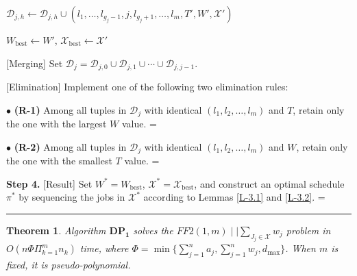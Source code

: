 \documentclass[12pt, eqno, limlimits]{article}
\newtheorem{theorem}{Theorem}[section]
\begin{document}
\begin{sloppypar}
\begin{algorithm}[tbp]
{{{{{                                $\mathcal{D}_{j,h} \leftarrow \mathcal{D}_{j,h} \cup (l_1, \ldots, l_{g_j-1}, j, l_{g_j+1}, \ldots, l_m, T', W', \mathcal{X}')$ \;
                                
                                { $W_{\text{best}} \gets W'$, $\mathcal{X}_{\text{best}} \gets \mathcal{X}'$ \;}
                            }	
                        }
                    }
                    
                    [Merging] Set $\mathcal{D}_{j}=\mathcal{D}_{j,0} \cup \mathcal{D}_{j,1} \cup \cdots \cup \mathcal{D}_{j,j-1}$. \;
                    
                    [Elimination] Implement one of the following two elimination rules:
                    
                    
                    $\bullet$ \textbf{(R-1)} Among all tuples in $\mathcal{D}_j$ with identical $(l_1, l_2, \dots, l_m)$ and $T$, retain only the one with the largest $W$ value. \hspace*{\algorithmicindent}%
                    \hangindent=\dimexpr{}\relax  %
                    
                    $\bullet$ \textbf{(R-2)} Among all tuples in $\mathcal{D}_j$ with identical $(l_1, l_2, \dots, l_m)$ and $W$, retain only the one with the smallest $T$ value. \hspace*{\algorithmicindent}%
                    \hangindent=\dimexpr{}\relax%
                }
            } 
            
            \textbf{Step 4.} [Result] Set $W^{*}=W_{\text{best}}$, $\mathcal{X}^{*}=\mathcal{X}_{\text{best}}$, and construct an optimal schedule $\pi^{*}$ by sequencing the jobs in $\mathcal{X}^{*}$ according to Lemmas \ref{L-3.1} and \ref{L-3.2}. \hspace*{\algorithmicindent}%
            \hangindent=\dimexpr{}\relax%
            
            \vspace{0.1cm}
            \hrule 
        \end{algorithm}
        
        \begin{theorem} \label{T-3.1}
            Algorithm $\mathbf{DP_1}$ solves the $FF2(1, m)\mid \mid \sum_{J_j \in \mathcal{X}} w_j$ problem in $O(n \Phi \Pi_{k=1}^m n_k)$ time, where $\Phi=\min\{\sum_{j=1}^n a_j,\sum_{j=1}^n w_j, d_{\max}\}$. When $m$ is fixed, it is pseudo-polynomial.
        \end{theorem}
        

\end{sloppypar}
\end{document}
